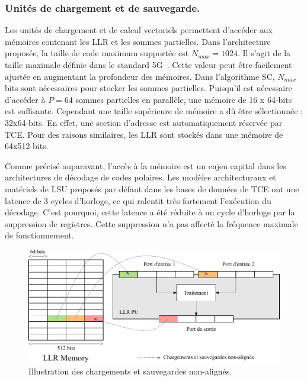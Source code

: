 \subsubsection{Unités de chargement et de sauvegarde.}



Les unités de chargement et de calcul vectoriels permettent d'accéder aux mémoires contenant les LLR et les sommes partielles. Dans l'architecture proposée, la taille de code maximum supportée est $N_{max}=1024$. Il s'agit de la taille maximale définie dans le standard 5G~\cite{3gpp_ts_2017}. Cette valeur peut être facilement ajustée en augmentant la profondeur des mémoires. Dans l'algorithme SC, $N_{max}$ bits sont nécessaires pour stocker les sommes partielles. Puisqu'il est nécessaire d'accéder à $P=64$ sommes partielles en parallèle, une mémoire de 16 x 64-bits est suffisante. Cependant une taille supérieure de mémoire a dû être sélectionnée : 32x64-bits. En effet, une section d'adresse est automatiquement réservée par TCE. Pour des raisons similaires, les LLR sont stockés dans une mémoire de 64x512-bits.

Comme précisé auparavant, l'accès à la mémoire est un enjeu capital dans les architectures de décodage de codes polaires. Les modèles architecturaux et matériels de LSU proposés par défaut dans les bases de données de TCE ont une latence de 3 cycles d'horloge, ce qui ralentit très fortement l’exécution du décodage. C'est pourquoi, cette latence a été réduite à un cycle d'horloge par la suppression de registres. Cette suppression n'a pas affecté la fréquence maximale de fonctionnement.
\begin{figure}[htp]
	\centering
	\includegraphics[width=\textwidth]{main/ch4_fig/unaligned}
	\caption{Illustration des chargements et sauvegardes non-alignés.}
	\label{fig:unaligned}
\end{figure}

